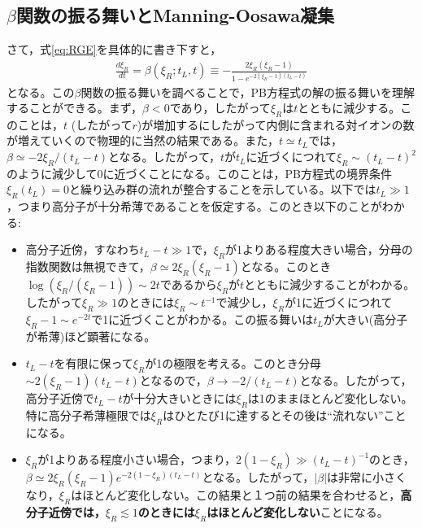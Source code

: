 \documentclass[11pt,a4paper]{ltjsarticle}
\theoremstyle{definition}
\theoremstyle{remark}
\begin{document}
\subsection{$\beta$関数の振る舞いとManning-Oosawa凝集}
さて，式\eqref{eq:RGE}を具体的に書き下すと，
\begin{align}
  \frac{d\xi_R}{dt} = \beta(\xi_R;t_L,t) \equiv -\frac{2\xi_R(\xi_R-1)}{1-e^{-2(\xi_R-1)(t_L-t)}} \label{eq:beta_function}
\end{align}
となる。この$\beta$関数の振る舞いを調べることで，PB方程式の解の振る舞いを理解することができる。まず，$\beta <0$であり，したがって$\xi_R$は$t$とともに減少する。このことは，$t$ (したがって$r$)が増加するにしたがって内側に含まれる対イオンの数が増えていくので物理的に当然の結果である。また，$t\simeq t_L$では，$\beta \simeq -2\xi_R/(t_L-t)$となる。したがって，$t$が$t_L$に近づくにつれて$\xi_R\sim (t_L-t)^2$のように減少して0に近づくことになる。このことは，PB方程式の境界条件$\xi_R(t_L)=0$と繰り込み群の流れが整合することを示している。以下では$t_L\gg 1$，つまり高分子が十分希薄であることを仮定する。このとき以下のことがわかる:
\begin{itemize}
  \item 高分子近傍，すなわち$t_L - t\gg1$で，$\xi_R$が1よりある程度大きい場合，分母の指数関数は無視できて，$\beta \simeq 2\xi_R(\xi_R-1)$となる。このとき$\log(\xi_R/(\xi_R-1))\sim 2t$であるから$\xi_R$が$t$とともに減少することがわかる。したがって$\xi_R\gg 1$のときには$\xi_R\sim t^{-1}$で減少し，$\xi_R$が1に近づくにつれて$\xi_R-1\sim e^{-2t}$で1に近づくことがわかる。この振る舞いは$t_L$が大きい(高分子が希薄)ほど顕著になる。
  \item $t_L-t$を有限に保って$\xi_R$が1の極限を考える。このとき分母$\sim 2(\xi_R-1)(t_L-t)$となるので，$\beta \to -2/(t_L-t)$となる。したがって，高分子近傍で$t_L-t$が十分大きいときには$\xi_R$は1のままほとんど変化しない。特に高分子希薄極限では$\xi_R$はひとたび1に達するとその後は``流れない''ことになる。
  \item $\xi_R$が1よりある程度小さい場合，つまり，$2(1-\xi_R) \gg (t_L-t)^{-1}$のとき，$\beta \simeq 2\xi_R(\xi_R-1)e^{-2(1-\xi_R)(t_L-t)}$となる。したがって，$|\beta|$は非常に小さくなり，$\xi_R$はほとんど変化しない。この結果と１つ前の結果を合わせると，\textbf{高分子近傍では，$\xi_R\lesssim 1$のときには$\xi_R$はほとんど変化しない}ことになる。
\end{itemize}
\end{document}
